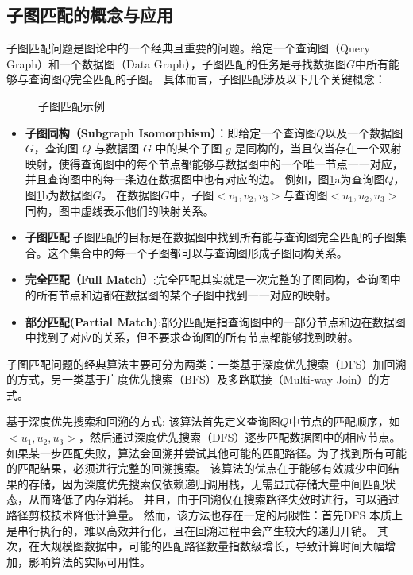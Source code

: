 \subsection{子图匹配的概念与应用}
子图匹配问题是图论中的一个经典且重要的问题。给定一个查询图（Query Graph）和一个数据图（Data Graph），子图匹配的任务是寻找数据图$G$中所有能够与查询图$Q$完全匹配的子图。
具体而言，子图匹配涉及以下几个关键概念：
\begin{figure}[h!]
    \centering
    \caption{子图匹配示例}
    \label{fig:example_subgraph_matching}
\end{figure}
\begin{itemize}
    \item \textbf{子图同构（Subgraph Isomorphism）}：即给定一个查询图$Q$以及一个数据图$G$，查询图 $Q$ 与数据图 $G$ 中的某个子图 $g$ 是同构的，当且仅当存在一个双射映射，使得查询图中的每个节点都能够与数据图中的一个唯一节点一一对应，并且查询图中的每一条边在数据图中也有对应的边。
    例如，图\ref{fig:example_subgraph_matching}a为查询图$Q$，图\ref{fig:example_subgraph_matching}b为数据图$G$。
    在数据图$G$中，子图$<v_1,v_2,v_3>$与查询图$<u_1,u_2,u_3>$同构，图中虚线表示他们的映射关系。
    \item \textbf{子图匹配}:子图匹配的目标是在数据图中找到所有能与查询图完全匹配的子图集合。这个集合中的每一个子图都可以与查询图形成子图同构关系。
    \item \textbf{完全匹配（Full Match）}:完全匹配其实就是一次完整的子图同构，查询图中的所有节点和边都在数据图的某个子图中找到一一对应的映射。
    \item \textbf{部分匹配(Partial Match)}:部分匹配是指查询图中的一部分节点和边在数据图中找到了对应的关系，但不要求查询图的所有节点都能够找到映射。
\end{itemize}


子图匹配问题的经典算法主要可分为两类：一类基于深度优先搜索（DFS）加回溯的方式\cite{sm-ullmann-DBLP:journals/jacm/Ullmann76}，另一类基于广度优先搜索（BFS）及多路联接（Multi-way Join）的方式\cite{sm-bfs-DBLP:conf/focs/AtseriasGM08}。

基于深度优先搜索和回溯的方式: 该算法首先定义查询图$Q$中节点的匹配顺序，如$<u_1, u_2, u_3>$，然后通过深度优先搜索（DFS）逐步匹配数据图中的相应节点。
如果某一步匹配失败，算法会回溯并尝试其他可能的匹配路径。为了找到所有可能的匹配结果，必须进行完整的回溯搜索。
该算法的优点在于能够有效减少中间结果的存储，因为深度优先搜索仅依赖递归调用栈，无需显式存储大量中间匹配状态，从而降低了内存消耗。
并且，由于回溯仅在搜索路径失效时进行，可以通过路径剪枝技术降低计算量。
然而，该方法也存在一定的局限性：首先DFS 本质上是串行执行的，难以高效并行化，且在回溯过程中会产生较大的递归开销。
其次，在大规模图数据中，可能的匹配路径数量指数级增长，导致计算时间大幅增加，影响算法的实际可用性。

